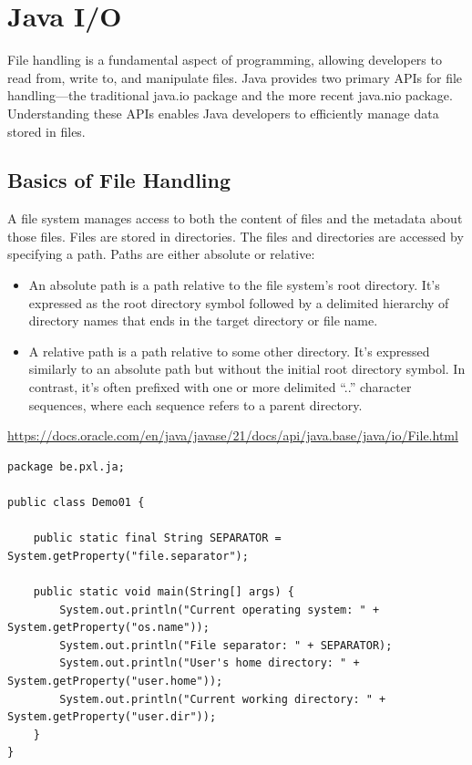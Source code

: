 \chapter{Java I/O}

 \begin{summary}
File handling is a fundamental aspect of programming, allowing developers to read from, write to, and manipulate files.  Java provides two primary APIs for file handling—the traditional java.io package and the more recent java.nio package. Understanding these APIs enables Java developers to efficiently manage data stored in files. 
 \end{summary}
 
 \section{Basics of File Handling}
 
A file system manages access to both the content of files and the metadata about those files.  Files are stored in directories.  The files and directories are accessed by specifying a path.  Paths are either absolute or relative:

\begin{itemize}
\item An absolute path is a path relative to the file system’s root directory. It’s expressed as the root directory symbol followed by a delimited hierarchy of directory names that ends in the target directory or file name.
\item A relative path is a path relative to some other directory. It’s expressed similarly to an absolute path but without the initial root directory symbol. In contrast, it’s often prefixed with one or more delimited “..” character sequences, where each sequence refers to a parent directory.
\end{itemize}

\begin{thm}
        \url{https://docs.oracle.com/en/java/javase/21/docs/api/java.base/java/io/File.html}
    \end{thm}


\begin{lstlisting}
package be.pxl.ja;

public class Demo01 {

	public static final String SEPARATOR = System.getProperty("file.separator");

	public static void main(String[] args) {
		System.out.println("Current operating system: " + System.getProperty("os.name"));
		System.out.println("File separator: " + SEPARATOR);
		System.out.println("User's home directory: " + System.getProperty("user.home"));
		System.out.println("Current working directory: " + System.getProperty("user.dir"));
	}
}
\end{lstlisting}


